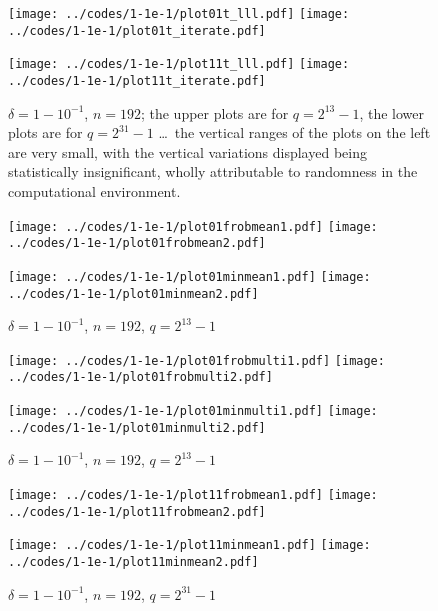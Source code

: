 \documentclass{article}
\begin{document}
\begin{figure}
\begin{centering}
{\texttt{[image: ../codes/1-1e-1/plot01t\_lll.pdf]}}
{\texttt{[image: ../codes/1-1e-1/plot01t\_iterate.pdf]}}

{\texttt{[image: ../codes/1-1e-1/plot11t\_lll.pdf]}}
{\texttt{[image: ../codes/1-1e-1/plot11t\_iterate.pdf]}}

\end{centering}
\caption{$\delta = 1-10^{-1}$, $n = 192$;
         the upper plots are for $q = 2^{13} - 1$,
         the lower plots are for $q = 2^{31} - 1$ \dots\
         the vertical ranges of the plots on the left are very small,
         with the vertical variations displayed
         being statistically insignificant, wholly attributable to randomness
         in the computational environment.}
\label{pstime1-1e-1}
\end{figure}

\begin{figure}
\begin{centering}
{\texttt{[image: ../codes/1-1e-1/plot01frobmean1.pdf]}}
{\texttt{[image: ../codes/1-1e-1/plot01frobmean2.pdf]}}

{\texttt{[image: ../codes/1-1e-1/plot01minmean1.pdf]}}
{\texttt{[image: ../codes/1-1e-1/plot01minmean2.pdf]}}

\end{centering}
\caption{$\delta = 1-10^{-1}$, $n = 192$, $q = 2^{13} - 1$}
\end{figure}

\begin{figure}
\begin{centering}
{\texttt{[image: ../codes/1-1e-1/plot01frobmulti1.pdf]}}
{\texttt{[image: ../codes/1-1e-1/plot01frobmulti2.pdf]}}

{\texttt{[image: ../codes/1-1e-1/plot01minmulti1.pdf]}}
{\texttt{[image: ../codes/1-1e-1/plot01minmulti2.pdf]}}

\end{centering}
\caption{$\delta = 1-10^{-1}$, $n = 192$, $q = 2^{13} - 1$}
\end{figure}

\begin{figure}
\begin{centering}
{\texttt{[image: ../codes/1-1e-1/plot11frobmean1.pdf]}}
{\texttt{[image: ../codes/1-1e-1/plot11frobmean2.pdf]}}

{\texttt{[image: ../codes/1-1e-1/plot11minmean1.pdf]}}
{\texttt{[image: ../codes/1-1e-1/plot11minmean2.pdf]}}

\end{centering}
\caption{$\delta = 1-10^{-1}$, $n = 192$, $q = 2^{31} - 1$}
\end{figure}
\end{document}
